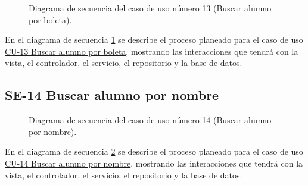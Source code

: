 \begin{figure}[htbp!]
	\begin{center}
		\caption{Diagrama de secuencia del caso de uso número 13 (Buscar alumno por boleta).}
		\label{fig:Diagrama de secuencia CU-13}
	\end{center}
\end{figure}

En el diagrama de secuencia \ref{fig:Diagrama de secuencia CU-13} se describe el proceso planeado para el caso de uso \hyperlink{CU-13}{CU-13 Buscar alumno por boleta}, mostrando las interacciones que tendrá con la vista, el controlador, el servicio, el repositorio y la base de datos.

\newpage

\subsection{SE-14 Buscar alumno por nombre}

\begin{figure}[htbp!]
	\begin{center}
		\caption{Diagrama de secuencia del caso de uso número 14 (Buscar alumno por nombre).}
		\label{fig:Diagrama de secuencia CU-14}
	\end{center}
\end{figure}

En el diagrama de secuencia \ref{fig:Diagrama de secuencia CU-14} se describe el proceso planeado para el caso de uso \hyperlink{CU-14}{CU-14 Buscar alumno por nombre}, mostrando las interacciones que tendrá con la vista, el controlador, el servicio, el repositorio y la base de datos.

